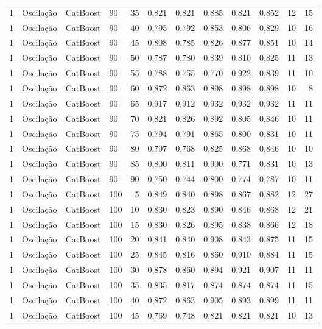 \begin{longtable}{ccclrrrrrrrr}
1 & Oscilação & CatBoost & 90 & 35 & 0,821 & 0,821 & 0,885 & 0,821 & 0,852 & 12 & 15 \\
1 & Oscilação & CatBoost & 90 & 40 & 0,795 & 0,792 & 0,853 & 0,806 & 0,829 & 10 & 16 \\
1 & Oscilação & CatBoost & 90 & 45 & 0,808 & 0,785 & 0,826 & 0,877 & 0,851 & 10 & 14 \\
1 & Oscilação & CatBoost & 90 & 50 & 0,787 & 0,780 & 0,839 & 0,810 & 0,825 & 11 & 13 \\
1 & Oscilação & CatBoost & 90 & 55 & 0,788 & 0,755 & 0,770 & 0,922 & 0,839 & 11 & 10 \\
1 & Oscilação & CatBoost & 90 & 60 & 0,872 & 0,863 & 0,898 & 0,898 & 0,898 & 10 & 8 \\
1 & Oscilação & CatBoost & 90 & 65 & 0,917 & 0,912 & 0,932 & 0,932 & 0,932 & 11 & 11 \\
1 & Oscilação & CatBoost & 90 & 70 & 0,821 & 0,826 & 0,892 & 0,805 & 0,846 & 10 & 11 \\
1 & Oscilação & CatBoost & 90 & 75 & 0,794 & 0,791 & 0,865 & 0,800 & 0,831 & 10 & 11 \\
1 & Oscilação & CatBoost & 90 & 80 & 0,797 & 0,768 & 0,825 & 0,868 & 0,846 & 10 & 10 \\
1 & Oscilação & CatBoost & 90 & 85 & 0,800 & 0,811 & 0,900 & 0,771 & 0,831 & 10 & 13 \\
1 & Oscilação & CatBoost & 90 & 90 & 0,750 & 0,744 & 0,800 & 0,774 & 0,787 & 10 & 11 \\
1 & Oscilação & CatBoost & 100 & 5 & 0,849 & 0,840 & 0,898 & 0,867 & 0,882 & 12 & 27 \\
1 & Oscilação & CatBoost & 100 & 10 & 0,830 & 0,823 & 0,890 & 0,846 & 0,868 & 12 & 21 \\
1 & Oscilação & CatBoost & 100 & 15 & 0,830 & 0,826 & 0,895 & 0,838 & 0,866 & 12 & 18 \\
1 & Oscilação & CatBoost & 100 & 20 & 0,841 & 0,840 & 0,908 & 0,843 & 0,875 & 11 & 15 \\
1 & Oscilação & CatBoost & 100 & 25 & 0,845 & 0,816 & 0,860 & 0,910 & 0,884 & 11 & 15 \\
1 & Oscilação & CatBoost & 100 & 30 & 0,878 & 0,860 & 0,894 & 0,921 & 0,907 & 11 & 11 \\
1 & Oscilação & CatBoost & 100 & 35 & 0,835 & 0,817 & 0,874 & 0,874 & 0,874 & 11 & 15 \\
1 & Oscilação & CatBoost & 100 & 40 & 0,872 & 0,863 & 0,905 & 0,893 & 0,899 & 11 & 11 \\
1 & Oscilação & CatBoost & 100 & 45 & 0,769 & 0,748 & 0,821 & 0,821 & 0,821 & 10 & 13 \\

\end{longtable}
